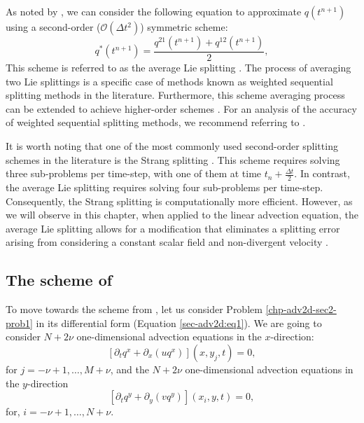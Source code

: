 As noted by \citet{strang:1968}, we can consider the following equation 
to approximate $q(t^{n+1})$ using a second-order ($\mathcal{O}(\Delta t^2)$) symmetric scheme:
\begin{equation}
	q^*(t^{n+1}) = \frac{q^{21}(t^{n+1}) + q^{12}(t^{n+1})}{2},
\end{equation}
This scheme is referred to as the average Lie splitting \citep{holden:2010}.
The process of averaging two Lie splittings is a specific case of methods
known as weighted sequential splitting methods in the literature.
Furthermore, this scheme averaging process can be extended to achieve higher-order schemes \citep{jia:2011}.
For an analysis of the accuracy of weighted sequential splitting methods, we recommend referring to \citet{csomos:2005}.

It is worth noting that one of the most commonly used second-order splitting schemes in the literature is the Strang splitting
\citep{strang:1968}.
This scheme requires solving three sub-problems per time-step, with one of them at time $t_n + \frac{\Delta t}{2}$.
In contrast, the average Lie splitting requires solving four sub-problems per time-step.
Consequently, the Strang splitting is computationally more efficient.
However, as we will observe in this chapter, when applied to the linear advection equation, 
the average Lie splitting allows for a modification that eliminates a splitting error
arising from considering a constant scalar field and non-divergent velocity \citep{lin:1996}.

\subsection{The scheme of \citet{lin:1996}}
To move towards the scheme from \citet{lin:1996}, let us consider Problem \ref{chp-adv2d-sec2-prob1} in its differential form (Equation \eqref{sec-adv2d:eq1}).
We are going to consider $N+2\nu$ one-dimensional advection equations in the $x$-direction:
\begin{equation*}
	\label{chp-adv2d-adv2deq-xdir1}
	[{\partial_t q^x}+{\partial_x (uq^x)}](x, y_j, t)
	= 0,
\end{equation*}
for $j=-\nu+1, \ldots, M+\nu$,
and the $N+2\nu$ one-dimensional advection equations in the $y$-direction
\begin{equation*}
	\label{chp-adv2d-adv2deq-ydir1}
	[{\partial_t q^y} +{\partial_y (vq^y)}](x_i, y, t) = 0,
\end{equation*}
for, $i=-\nu+1, \ldots, N+\nu$.

